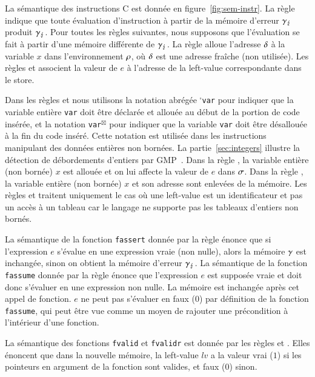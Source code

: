 

La sémantique des instructions C est donnée en figure~\ref{fig:sem-instr}.
La règle  indique que toute évaluation d'instruction à partir de
la mémoire d'erreur $\gamma_\lightning$ produit $\gamma_\lightning$.
Pour toutes les règles suivantes, nous supposons que l'évaluation se fait à
partir d'une mémoire différente de $\gamma_\lightning$. 
La règle  alloue l'adresse $\delta$ à la variable $x$
dans l'environnement $\rho$, où $\delta$ est une adresse fraîche (non utilisée).
Les règles  et  associent la valeur de $e$
à l'adresse de la left-value correspondante dans le store.

Dans les règles  et  nous utilisons la
notation abrégée ${}^{\square}$\lstinline'var' pour indiquer que la variable
entière \lstinline'var' doit être déclarée et allouée au début de la portion de
code insérée, et la notation \lstinline'var'${}^{\boxtimes}$ pour indiquer que la
variable \lstinline'var' doit être désallouée à la fin du code inséré.
Cette notation est utilisée dans les instructions manipulant des données
entières non bornées.
La partie~\ref{sec:integers} illustre la détection de débordements d'entiers par
GMP~\cite{GMP}.
Dans la règle , la variable entière (non bornée) $x$ est
allouée et on lui affecte la valeur de $e$ dans $\sigma$.
Dans la règle , la variable entière (non bornée) $x$ et son
adresse sont enlevées de la mémoire.
Les règles  et  traitent uniquement le cas
où une left-value est un identificateur et pas un accès à un tableau car le
langage \eacsl ne supporte pas les tableaux d'entiers non bornés.

La sémantique de la fonction \lstinline'fassert' donnée par la règle
 énonce que si l'expression $e$ s'évalue en une expression
vraie (non nulle), alors la mémoire $\gamma$ est inchangée, sinon on obtient
la mémoire d'erreur $\gamma_\lightning$.
La sémantique de la fonction \lstinline'fassume' donnée par la règle
 énonce que l'expression $e$ est supposée vraie et
doit donc s'évaluer en une expression non nulle.
La mémoire est inchangée après cet appel de fonction.
$e$ ne peut pas s'évaluer en faux ($0$) par définition de la fonction
\lstinline'fassume', qui peut être vue comme un moyen de rajouter une
précondition à l'intérieur d'une fonction.

La sémantique des fonctions \lstinline'fvalid' et \lstinline'fvalidr' est donnée
par les règles  et .
Elles énoncent que dans la nouvelle mémoire, la left-value $\mathit{lv}$ a
la valeur vrai ($1$) si les pointeurs en argument de la fonction sont valides,
et faux ($0$) sinon.

